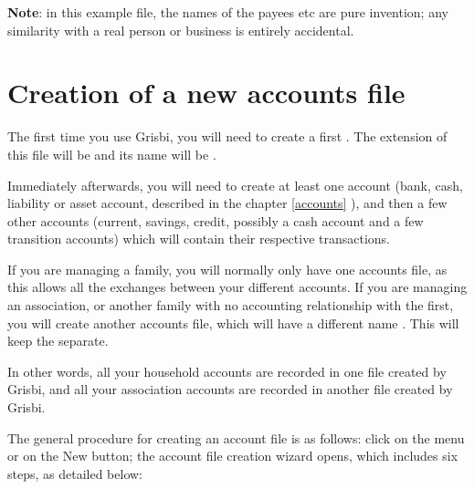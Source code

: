 \textbf{Note}: in this example file, the names of the payees etc are pure invention; any similarity with a real person or business is entirely accidental.

\section{Creation of a new accounts file\label{start-newfile}}


The first time you use Grisbi, you will need to create a first
. The \gls{extension} of this file will be  and its name will be .

Immediately afterwards, you will need to create at least one account (bank, cash, liability or asset account, described in the chapter \vref{accounts} ), and then a few other accounts (current, savings, credit, possibly a cash account and a few transition accounts) which will contain their respective transactions.

If you are managing a family, you will normally only have one accounts file, as this allows all the exchanges between your different accounts. If you are managing an association, or another family with no accounting relationship with the first, you will create another accounts file, which will have a different name . This will keep the  separate.

In other words, all your household accounts are recorded in one file created by Grisbi, and all your association accounts are recorded in another file created by Grisbi.


The general procedure for creating an account file is as follows: click on the menu  or on the New button; the account file creation wizard opens, which includes six steps, as detailed below:


